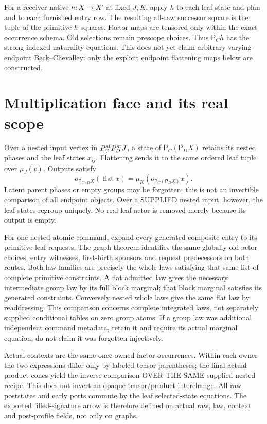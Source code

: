 \documentclass[11pt]{article}
\begin{document}
For a receiver-native $h:X\to X'$ at fixed $J,K$, apply $h$ to each leaf state and plan and to each furnished entry row. The resulting all-raw successor square is the tuple of the primitive $h$ squares. Factor maps are tensored only within the exact occurrence schema. Old selections remain prescope choices. Thus $\mathsf P_Ch$ has the strong indexed naturality equations. This does not yet claim arbitrary varying-endpoint Beck--Chevalley: only the explicit endpoint flattening maps below are constructed.

\section{Multiplication face and its real scope}
Over a nested input vertex in $P_C^{\rm at}P_D^{\rm at}J$, a state of $\mathsf P_C(\mathsf P_DX)$ retains its nested phases and the leaf states $x_{ij}$. Flattening sends it to the same ordered leaf tuple over $\mu_J(v)$. Outputs satisfy
\[
 o_{\mathsf P_{C\circ D}X}(\operatorname{flat}x)
   =\mu_K(o_{\mathsf P_C(\mathsf P_DX)}x).
\]
Latent parent phases or empty groups may be forgotten; this is not an invertible comparison of all endpoint objects. Over a SUPPLIED nested input, however, the leaf states regroup uniquely. No real leaf actor is removed merely because its output is empty.

For one nested atomic command, expand every generated composite entry to its primitive leaf requests. The graph theorem identifies the same globally old actor choices, entry witnesses, first-birth sponsors and request predecessors on both routes. Both law families are precisely the whole laws satisfying that same list of complete primitive constraints. A flat admitted law gives the necessary intermediate group law by its full block marginal; that block marginal satisfies its generated constraints. Conversely nested whole laws give the same flat law by readdressing. This comparison concerns complete integrated laws, not separately supplied conditional tables on zero group atoms. If a group law was additional independent command metadata, retain it and require its actual marginal equation; do not claim it was forgotten injectively.

Actual contexts are the same once-owned factor occurrences. Within each owner the two expressions differ only by labeled tensor parentheses; the final actual product cones yield the inverse comparison OVER THE SAME supplied nested recipe. This does not invert an opaque tensor/product interchange. All raw poststates and early ports commute by the leaf selected-state equations. The exported filled-signature arrow is therefore defined on actual raw, law, context and post-profile fields, not only on graphs.
\end{document}
